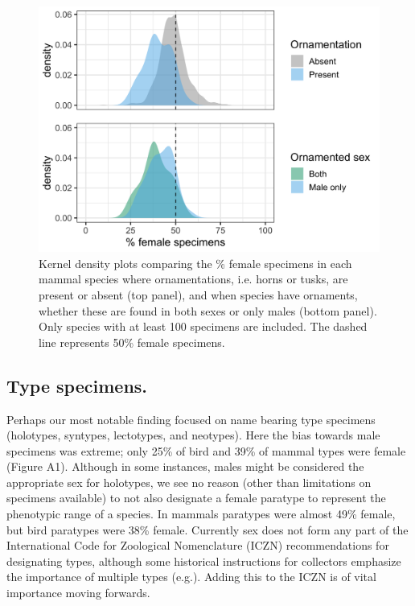 \documentclass[a4paper, 12pt]{article}
\begin{document}
\begin{figure}
 \centering
  \includegraphics[width = \linewidth]{figures/ornamentation.png}
  \caption{Kernel density plots comparing the \% female specimens in each mammal species where ornamentations, i.e. horns or tusks, are present or absent (top panel), and when species have ornaments, whether these are found in both sexes or only males (bottom panel). 
  Only species with at least 100 specimens are included. 
  The dashed line represents 50\% female specimens. 
}
  \label{fig-horns}
\end{figure}

\subsection{Type specimens.} 
Perhaps our most notable finding focused on name bearing type specimens (holotypes, syntypes, lectotypes, and neotypes). 
Here the bias towards male specimens was extreme; only 25\% of bird and 39\% of mammal types were female (Figure A1). 
Although in some instances, males might be considered the appropriate sex for holotypes, we see no reason (other than limitations on specimens available) to not also designate a female paratype to represent the phenotypic range of a species. 
In mammals paratypes were almost 49\% female, but bird paratypes were 38\% female. 
Currently sex does not form any part of the International Code for Zoological Nomenclature (ICZN) recommendations for designating types, although some historical instructions for collectors emphasize the importance of multiple types (e.g.\cite{schuchert1897type}). 
Adding this to the ICZN is of vital importance moving forwards.
\end{document}
